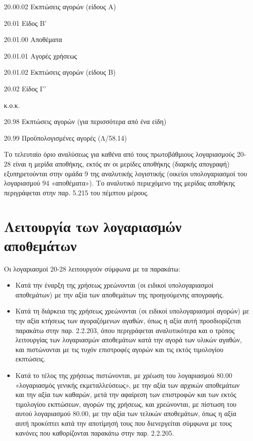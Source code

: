 \documentclass[A4,10pt,greek]{book}
\begin{document}
20.00.02    Εκπτώσεις αγορών (είδους Α)

20.01    Είδος Β'

20.01.00 Αποθέματα

20.01.01 Αγορές χρήσεως

20.01.02 Εκπτώσεις αγορών (είδους Β)

20.02    Είδος Γ'

  κ.ο.κ.

20.98    Εκπτώσεις αγορών (για περισσότερα από ένα είδη)

20.99    Προϋπολογισμένες αγορές (Λ/58.14)

Το τελευταίο όριο αναλύσεως για καθένα από τους πρωτοβάθμιους λογαριασμούς 20-28 είναι η μερίδα αποθήκης, εκτός αν οι μερίδες αποθήκης (διαρκής απογραφή) εξυπηρετούνται στην ομάδα 9 της αναλυτικής λογιστικής (οικείοι υπολογαριασμοί του λογαριασμού 94 «αποθέματα»). Το αναλυτικό περιεχόμενο της μερίδας αποθήκης περιγράφεται στην παρ. 5.215 του πέμπτου μέρους.

\section{Λειτουργία των λογαριασμών αποθεμάτων}

Οι λογαριασμοί 20-28 λειτουργούν σύμφωνα με τα παρακάτω:

\begin{itemize}


\item Κατά την έναρξη της χρήσεως χρεώνονται (οι ειδικοί υπολογαριασμοί αποθεμάτων) με την αξία των αποθεμάτων της προηγούμενης απογραφής.

\item Κατά τη διάρκεια της χρήσεως χρεώνονται (οι ειδικοί υπολογαριασμοί αγορών) με την αξία κτήσεως των αγοραζόμενων αγαθών, όπως η αξία αυτή προσδιορίζεται παρακάτω στην παρ. 2.2.203, όπου περιγράφεται αναλυτικότερα και ο τρόπος λειτουργίας των λογαριασμών αποθεμάτων κατά την αγορά των υλικών αγαθών, και πιστώνονται με τις τυχόν επιστροφές αγορών και τις εκτός τιμολογίου εκπτώσεις.

\item Κατά το τέλος της χρήσεως πιστώνονται, με χρέωση του λογαριασμού 80.00 «λογαριασμός γενικής εκμεταλλεύσεως», με την αξία των αρχικών αποθεμάτων και την αξία των καθαρών, μετά την αφαίρεση των επιστροφών και των εκτός τιμολογίου εκπτώσεων, αγορών της χρήσεως, και χρεώνονται, με πίστωση του αυτού λογαριασμού 80.00, με την αξία των τελικών αποθεμάτων, όπως η αξία αυτή προκύπτει κατά την αποτίμησή τους που διενεργείται σύμφωνα με τους κανόνες που καθορίζονται παρακάτω στην παρ. 2.2.205.

\end{itemize}
\end{document}
